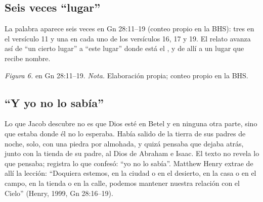 \subsection{Seis veces “lugar”}

La palabra  aparece seis veces en Gn 28:11--19 (conteo propio en la BHS): tres en el versículo 11 y una en cada uno de los versículos 16, 17 y 19. El relato avanza así de ``un cierto lugar'' a ``este lugar'' donde está el \SENOR{}, y de allí a un lugar que recibe nombre.

\begin{center}
\par
{\footnotesize\color{gris}\textit{Figura 6.}  en Gn 28:11--19. \textit{Nota.} Elaboración propia; conteo propio en la BHS.}
\end{center}

\subsection{“Y yo no lo sabía”}

Lo que Jacob descubre no es que Dios esté en Betel y en ninguna otra parte, sino que estaba donde él no lo esperaba. Había salido de la tierra de sus padres de noche, solo, con una piedra por almohada, y quizá pensaba que dejaba atrás, junto con la tienda de su padre, al Dios de Abraham e Isaac. El texto no revela lo que pensaba; registra lo que confesó: ``yo no lo sabía''. Matthew Henry extrae de allí la lección: ``Doquiera estemos, en la ciudad o en el desierto, en la casa o en el campo, en la tienda o en la calle, podemos mantener nuestra relación con el Cielo'' (Henry, 1999, Gn 28:16--19).

